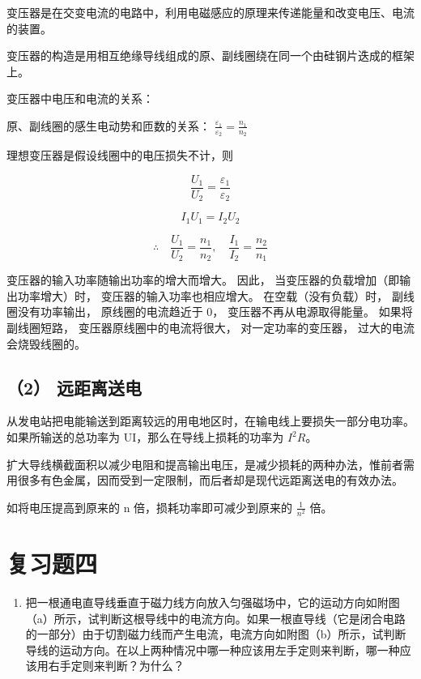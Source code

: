 变压器是在交变电流的电路中，利用电磁感应的原理来传递能量和改变电压、电流的装置。

变压器的构造是用相互绝缘导线组成的原、副线圈绕在同一个由硅钢片迭成的框架上。

变压器中电压和电流的关系：

原、副线圈的感生电动势和匝数的关系：
\(\frac{\varepsilon_1}{\varepsilon_2} = \frac{n_1}{n_2}\)

理想变压器是假设线圈中的电压损失不计，则

\[
\frac{U_{1}}{U_{2}} = \frac{\varepsilon_{1}}{\varepsilon_{2}}
\]

\[
I_{1} U_{1} = I_{2} U_{2}
\]

\[
\therefore \quad \frac{U_{1}}{U_{2}} = \frac{n_{1}}{n_{2}}, \quad \frac{I_{1}}{I_{2}} = \frac{n_{2}}{n_{1}}
\]

变压器的输入功率随输出功率的增大而增大。 因此，
当变压器的负载增加（即输出功率增大）时， 变压器的输入功率也相应增大。
在空载（没有负载）时， 副线圈没有功率输出， 原线圈的电流趋近于 0，
变压器不再从电源取得能量。 如果将副线圈短路，
变压器原线圈中的电流将很大， 对一定功率的变压器，
过大的电流会烧毁线圈的。

\subsection{（2） 远距离送电}\label{ux8fdcux8dddux79bbux9001ux7535}

从发电站把电能输送到距离较远的用电地区时，在输电线上要损失一部分电功率。如果所输送的总功率为
UI，那么在导线上损耗的功率为 \(I^{2}R\)。

扩大导线横截面积以减少电阻和提高输出电压，是减少损耗的两种办法，惟前者需用很多有色金属，因而受到一定限制，而后者却是现代远距离送电的有效办法。

如将电压提高到原来的 n 倍，损耗功率即可减少到原来的 \(\frac{1}{n^{2}}\)
倍。

\section{复习题四}\label{ux590dux4e60ux9898ux56db}

\begin{enumerate}
\def\labelenumi{\arabic{enumi}.}
\tightlist
\item
  把一根通电直导线垂直于磁力线方向放入匀强磁场中，它的运动方向如附图（a）所示，试判断这根导线中的电流方向。如果一根直导线（它是闭合电路的一部分）由于切割磁力线而产生电流，电流方向如附图（b）所示，试判断导线的运动方向。在以上两种情况中哪一种应该用左手定则来判断，哪一种应该用右手定则来判断？为什么？
\end{enumerate}


